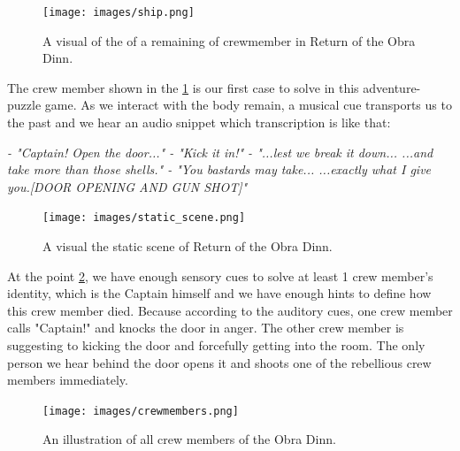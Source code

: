             \begin{figure}[H]
                \centering
                \texttt{[image: images/ship.png]}
                \caption{A visual of the of a remaining of crewmember in Return of the Obra Dinn.}
                \label{fig:CREWMEMBER}
            \end{figure}

            The crew member shown in the \ref{fig:CREWMEMBER} is our first case to solve in this adventure-puzzle game. As we interact with the body remain, a musical cue transports us to the past and we hear an audio snippet which transcription is like that:\par
            \emph{
                \newline
                - "Captain! Open the door..."\newline
                - "Kick it in!"\newline
                - "...lest we break it down... ...and take more than those shells."\newline
                - "You bastards may take... ...exactly what I give you.[DOOR OPENING AND GUN SHOT]"\newline
                }

            \begin{figure}[H]
                \centering
                \texttt{[image: images/static\_scene.png]}
                \caption{A visual the static scene of Return of the Obra Dinn.}
                \label{fig:STATICSCENE}
            \end{figure}            

            At the point \ref{fig:STATICSCENE}, we have enough sensory cues to solve at least 1 crew member's identity, which is the Captain himself and we have enough hints to define how this crew member died. Because according to the auditory cues, one crew member calls "Captain!" and knocks the door in anger. The other crew member is suggesting to kicking the door and forcefully getting into the room. The only person we hear behind the door opens it and shoots one of the rebellious crew members immediately.\par

            \begin{figure}[H]
                \centering
                \texttt{[image: images/crewmembers.png]}
                \caption{An illustration of all crew members of the Obra Dinn.}
                \label{fig:SHIPCREW}
            \end{figure}   

